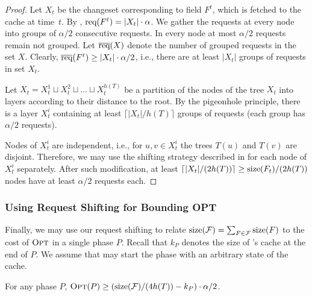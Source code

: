 \begin{proof}
Let $X_t$ be the changeset corresponding to field $F^t$, which is fetched to the cache
at time~$t$. By , $\textrm{req}(F^t) = |X_t|
\cdot \alpha$. We gather the requests at every node into groups of $\alpha/2$
consecutive requests. In every node at most $\alpha/2$ requests remain not
grouped. Let $\overline{\textrm{req}}(X)$ denote the number of grouped requests in the
set $X$. Clearly, $\overline{\textrm{req}}(F^t) \geq |X_t| \cdot \alpha / 2$, i.e.,
there are at least $|X_t|$ groups of requests in set $X_t$.

Let $X_t = X_t^1 \sqcup X_t^2 \sqcup \dots \sqcup X_t^{h(T)}$ be a partition
of the nodes of the tree $X_t$ into layers according to their distance to the
root. By the pigeonhole principle, there is a layer $X_t^i$ containing at
least $\lceil |X_t| / h(T) \rceil$ groups of requests (each group has
$\alpha/2$ requests).

Nodes of $X_t^i$ are independent, i.e., for $u, v \in X_t^i$ the trees $T(u)$
and $T(v)$ are disjoint. Therefore, we may use the shifting strategy described
in  for each node of $X_t^i$ separately. After such
modification, at least $\lceil |X_t| / (2 h(T)) \rceil \geq \textrm{size}(F_t) / (2
h(T))$ nodes have at least $\alpha / 2$ requests each.
\end{proof}



\subsubsection{Using Request Shifting for Bounding OPT}
\label{sec:lower-bound}

Finally, we may use our request shifting to relate $\textrm{size}(\mathcal{F}) =
\sum_{F \in \mathcal{F}} \textrm{size}(F)$ to the cost of $\textsc{Opt}$ in a single phase $P$.
Recall that $k_P$ denotes the size of \ALGTC's cache at the end of $P$. We
assume that {\OPT} may start the phase with an arbitrary state of the cache.

\begin{lemma}
\label{lem:leftovers}
For any phase $P$, $\textsc{Opt}(P) \geq (\textrm{size}(\mathcal{F}) / (4 h(T)) - k_P)
\cdot \alpha/2$.
\end{lemma}

